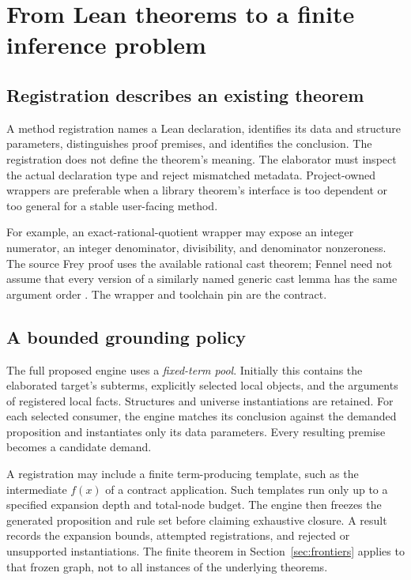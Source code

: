 \documentclass[11pt,a4paper]{article}
\theoremstyle{definition}
\theoremstyle{remark}
\begin{document}
\section{From Lean theorems to a finite inference problem}
\label{sec:grounding}

\subsection{Registration describes an existing theorem}
A method registration names a Lean declaration, identifies its data and
structure parameters, distinguishes proof premises, and identifies the
conclusion. The registration does not define the theorem's meaning. The
elaborator must inspect the actual declaration type and reject mismatched
metadata. Project-owned wrappers are preferable when a library theorem's
interface is too dependent or too general for a stable user-facing method.

For example, an exact-rational-quotient wrapper may expose an integer numerator,
an integer denominator, divisibility, and denominator nonzeroness. The source
Frey proof uses the available rational cast theorem; Fennel need not assume
that every version of a similarly named generic cast lemma has the same
argument order \cite{frey}. The wrapper and toolchain pin are the contract.

\subsection{A bounded grounding policy}
The full proposed engine uses a \emph{fixed-term pool}. Initially this contains
the elaborated target's subterms, explicitly selected local objects, and the
arguments of registered local facts. Structures and universe instantiations
are retained. For each selected consumer, the engine matches its conclusion
against the demanded proposition and instantiates only its data parameters.
Every resulting premise becomes a candidate demand.

A registration may include a finite term-producing template, such as the
intermediate $f(x)$ of a contract application. Such templates run only up to a
specified expansion depth and total-node budget. The engine then freezes the
generated proposition and rule set before claiming exhaustive closure. A
result records the expansion bounds, attempted registrations, and rejected or
unsupported instantiations. The finite theorem in Section~\ref{sec:frontiers}
applies to that frozen graph, not to all instances of the underlying theorems.
\end{document}
